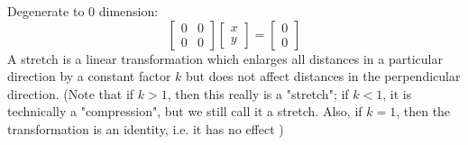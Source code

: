 \documentclass[a4paper,12pt]{report}
\begin{document}
Degenerate to 0 dimension:
\[\begin{bmatrix}0 & 0\\0 & 0\end{bmatrix}\begin{bmatrix}x \\ y\end{bmatrix}=\begin{bmatrix}0 \\ 0\end{bmatrix}\]
A stretch is a linear transformation which enlarges all distances in a particular direction by a constant factor $k$ but does not affect distances in the perpendicular direction. (Note that if $k > 1$, then this really is a "stretch"; if $k < 1$, it is technically a "compression", but we still call it a stretch. Also, if $k = 1$, then the transformation is an identity, i.e. it has no effect
)
\end{document}
